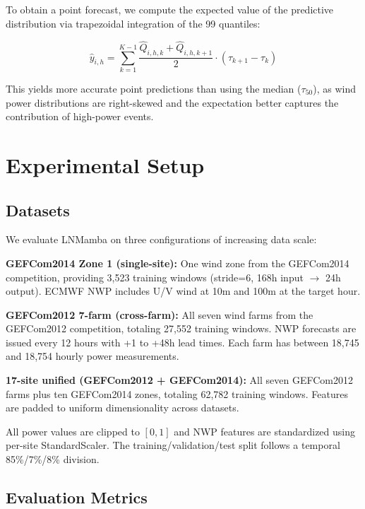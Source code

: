 \documentclass[review]{elsarticle}
\begin{document}
To obtain a point forecast, we compute the expected value of the predictive distribution via trapezoidal integration of the 99 quantiles:

\begin{equation}
\hat{y}_{i,h} = \sum_{k=1}^{K-1} \frac{\hat{Q}_{i,h,k} + \hat{Q}_{i,h,k+1}}{2} \cdot (\tau_{k+1} - \tau_k)
\end{equation}

This yields more accurate point predictions than using the median ($\tau_{50}$), as wind power distributions are right-skewed and the expectation better captures the contribution of high-power events.

\section{Experimental Setup}

\subsection{Datasets}

We evaluate LNMamba on three configurations of increasing data scale:

\textbf{GEFCom2014 Zone 1 (single-site):} One wind zone from the GEFCom2014 competition, providing 3,523 training windows (stride=6, 168h input $\to$ 24h output). ECMWF NWP includes U/V wind at 10m and 100m at the target hour.

\textbf{GEFCom2012 7-farm (cross-farm):} All seven wind farms from the GEFCom2012 competition, totaling 27,552 training windows. NWP forecasts are issued every 12 hours with +1 to +48h lead times. Each farm has between 18,745 and 18,754 hourly power measurements.

\textbf{17-site unified (GEFCom2012 + GEFCom2014):} All seven GEFCom2012 farms plus ten GEFCom2014 zones, totaling 62,782 training windows. Features are padded to uniform dimensionality across datasets.

All power values are clipped to $[0,1]$ and NWP features are standardized using per-site StandardScaler. The training/validation/test split follows a temporal 85\%/7\%/8\% division.

\subsection{Evaluation Metrics}
\end{document}
